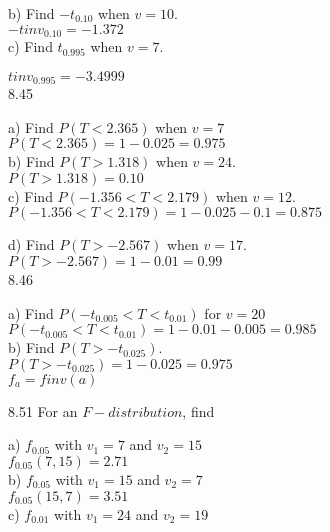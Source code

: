 b) Find $-t_{0.10}$ when $v = 10$. \\

$-tinv_{0.10} = -1.372$ \\

c) Find $t_{0.995}$ when $v = 7$.

$tinv_{0.995} = -3.4999$ \\

8.45

a) Find $P(T < 2.365)$ when $v = 7$ \\

$P(T < 2.365) = 1 - 0.025 = 0.975$ \\

b) Find $P(T > 1.318)$ when $v = 24$. \\

$P(T > 1.318) = 0.10$ \\

c) Find $P(-1.356 < T < 2.179)$ when $v = 12$. \\

$P(-1.356 < T < 2.179) = 1- 0.025 -0.1 = 0.875$

d) Find $P(T > -2.567)$ when $v = 17$. \\

$P(T > -2.567) = 1  -0.01 = 0.99$ \\

8.46 

a) Find $P(-t_{0.005} < T < t_{0.01})$ for $v = 20$ \\

$P(-t_{0.005} < T < t_{0.01}) = 1 - 0.01 - 0.005 = 0.985$ \\

b) Find $P(T > -t_{0.025})$. \\

$P(T > -t_{0.025}) = 1 - 0.025 = 0.975$ \\


$f_a = finv(a)$

8.51 For an $F-distribution$, find

a) $f_{0.05}$ with $v_1 = 7$ and $v_2 = 15$ \\

$f_{0.05}(7,15) = 2.71$ \\

b) $f_{0.05}$ with $v_1 = 15$ and $v_2 = 7$ \\

$f_{0.05}(15,7) = 3.51$ \\

c) $f_{0.01}$ with $v_1 = 24$ and $v_2 = 19$ \\

